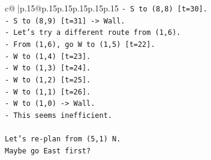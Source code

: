 \documentclass{article}
\begin{document}
{\begin{supertabular}{c@{$\;$}|p{.15\linewidth}@{}p{.15\linewidth}p{.15\linewidth}p{.15\linewidth}p{.15\linewidth}p{.15\linewidth}}
{{{\texttt{{-} S to (8,8) {[}t=30{]}.} \\
\texttt{{-} S to (8,9) {[}t=31{]} {-}> Wall.} \\
\texttt{{-} Let's try a different route from (1,6).} \\
\texttt{{-} From (1,6), go W to (1,5) {[}t=22{]}.} \\
\texttt{{-} W to (1,4) {[}t=23{]}.} \\
\texttt{{-} W to (1,3) {[}t=24{]}.} \\
\texttt{{-} W to (1,2) {[}t=25{]}.} \\
\texttt{{-} W to (1,1) {[}t=26{]}.} \\
\texttt{{-} W to (1,0) {-}> Wall.} \\
\texttt{{-} This seems inefficient.} \\
\\ 
\texttt{Let's re{-}plan from (5,1) N.} \\
\texttt{Maybe go East first?} \\
}}}
\end{supertabular}}
\end{document}
